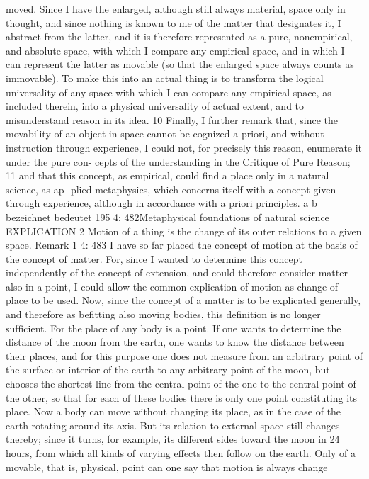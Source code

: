 moved. Since I have the enlarged, although still always material, space
only in thought, and since nothing is known to me of the matter that
designates it, I abstract from the latter, and it is therefore represented
as a pure, nonempirical, and absolute space, with which I compare any
empirical space, and in which I can represent the latter as movable (so
that the enlarged space always counts as immovable). To make this into
an actual thing is to transform the logical universality of any space with
which I can compare any empirical space, as included therein, into a
physical universality of actual extent, and to misunderstand reason in its
idea. 10
Finally, I further remark that, since the movability of an object in space
cannot be cognized a priori, and without instruction through experience,
I could not, for precisely this reason, enumerate it under the pure con-
cepts of the understanding in the Critique of Pure Reason; 11 and that this
concept, as empirical, could ﬁnd a place only in a natural science, as ap-
plied metaphysics, which concerns itself with a concept given through
experience, although in accordance with a priori principles.
a
b
bezeichnet
bedeutet
195
4: 482Metaphysical foundations of natural science
EXPLICATION 2
Motion of a thing is the change of its outer relations to a given space.
Remark 1
4: 483
I have so far placed the concept of motion at the basis of the concept of
matter. For, since I wanted to determine this concept independently of
the concept of extension, and could therefore consider matter also in a
point, I could allow the common explication of motion as change of place to
be used. Now, since the concept of a matter is to be explicated generally,
and therefore as beﬁtting also moving bodies, this deﬁnition is no longer
sufﬁcient. For the place of any body is a point. If one wants to determine
the distance of the moon from the earth, one wants to know the distance
between their places, and for this purpose one does not measure from
an arbitrary point of the surface or interior of the earth to any arbitrary
point of the moon, but chooses the shortest line from the central point of
the one to the central point of the other, so that for each of these bodies
there is only one point constituting its place. Now a body can move
without changing its place, as in the case of the earth rotating around
its axis. But its relation to external space still changes thereby; since it
turns, for example, its different sides toward the moon in 24 hours, from
which all kinds of varying effects then follow on the earth. Only of a
movable, that is, physical, point can one say that motion is always change
